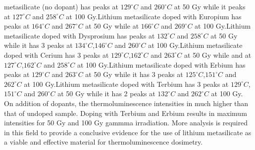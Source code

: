 \documentclass[../Report.tex]{subfiles}
\begin{document}
    metasilicate (no dopant) has peaks at $129^{\circ}C$ and $260^{\circ}C$ at 50 Gy while it peaks at $127^{\circ}C$ 
    and $258^{\circ}C$ at 100 Gy.Lithium metasilicate doped with Europium has peaks at $164^{\circ}C$ and $267^{\circ}C$ 
    at 50 Gy while at $166^{\circ}C$ and $269^{\circ}C$ at 100 Gy.Lithium metasilicate doped with Dysprosium has peaks 
    at $132^{\circ}C$ and $258^{\circ}C$ at 50 Gy while it has 3 peaks at $134^{\circ}C$,$146^{\circ}C$ and $260^{\circ}C$ 
    at 100 Gy.Lithium metasilicate doped with Cerium has 3 peaks at $129^{\circ}C$,$162^{\circ}C$ and $263^{\circ}C$ at 
    50 Gy while and at $127^{\circ}C$,$162^{\circ}C$ and $258^{\circ}C$ at 100 Gy.Lithium metasilicate doped with Erbium 
    has peaks at $129^{\circ}C$ and $263^{\circ}C$ at 50 Gy while it has 3 peaks at $125^{\circ}C$,$151^{\circ}C$ and 
    $262^{\circ}C$ at 100 Gy.Lithium metasilicate doped with Terbium has 3 peaks at $129^{\circ}C$,$151^{\circ}C$ and 
    $260^{\circ}C$ at 50 Gy while it has 2 peaks at $132^{\circ}C$ and $262^{\circ}C$ at 100 Gy. On addition of dopants, the thermoluminescence intensities in
    much higher than that of undoped sample. Doping with Terbium and Erbium results in maximum intensities for 50 Gy and 100 Gy 
    gammma irradiation. More analysis is required in this field to provide a conclusive evidence for the use of lithium metasilicate
    as a viable and effective material for thermoluminescence dosimetry.
\end{document}
